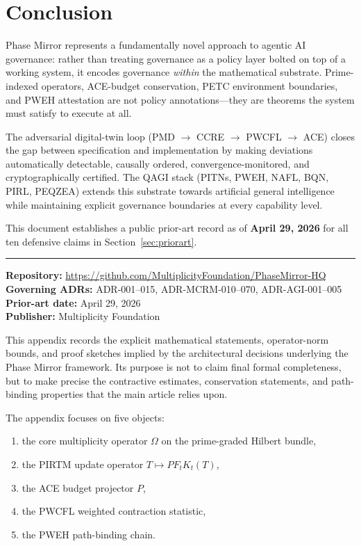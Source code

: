 \documentclass[12pt,a4paper]{article}
\theoremstyle{definition}
\theoremstyle{plain}
\theoremstyle{remark}
\begin{document}
\newpage

\section{Conclusion}
\label{sec:conclusions}

Phase Mirror represents a fundamentally novel approach to agentic AI governance:
rather than treating governance as a policy layer bolted on top of a working
system, it encodes governance \emph{within} the mathematical substrate.
Prime-indexed operators, ACE-budget conservation, PETC environment boundaries,
and PWEH attestation are not policy annotations---they are theorems the system
must satisfy to execute at all.

The adversarial digital-twin loop (PMD $\to$ CCRE $\to$ PWCFL $\to$ ACE)
closes the gap between specification and implementation by making deviations
automatically detectable, causally ordered, convergence-monitored, and
cryptographically certified. The QAGI stack (PITNs, PWEH, NAFL, BQN, PIRL,
PEQZEA) extends this substrate towards artificial general intelligence while
maintaining explicit governance boundaries at every capability level.

This document establishes a public prior-art record as of \textbf{April 29, 2026}
for all ten defensive claims in Section~\ref{sec:priorart}.

\vspace{1.5em}
\hrule
\vspace{0.8em}
\noindent\textbf{Repository:}
\url{https://github.com/MultiplicityFoundation/PhaseMirror-HQ}\\
\textbf{Governing ADRs:} ADR-001--015, ADR-MCRM-010--070, ADR-AGI-001--005\\
\textbf{Prior-art date:} April 29, 2026\\
\textbf{Publisher:} Multiplicity Foundation

\appendix

This appendix records the explicit mathematical statements, operator-norm bounds,
and proof sketches implied by the architectural decisions underlying the Phase
Mirror framework. Its purpose is not to claim final formal completeness, but to
make precise the contractive estimates, conservation statements, and path-binding
properties that the main article relies upon.

The appendix focuses on five objects:
\begin{enumerate}[label=(\roman*)]
  \item the core multiplicity operator $\Omega$ on the prime-graded Hilbert bundle,
  \item the PIRTM update operator $T \mapsto P F_t K_t(T)$,
  \item the ACE budget projector $P$,
  \item the PWCFL weighted contraction statistic,
  \item the PWEH path-binding chain.
\end{enumerate}
\end{document}
